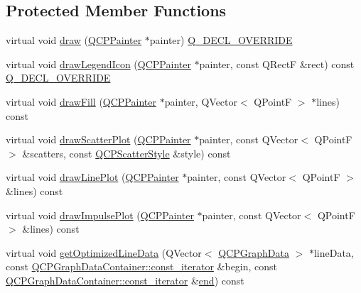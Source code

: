 \subsection*{Protected Member Functions}
\begin{DoxyCompactItemize}
\item 
virtual void \mbox{\hyperlink{class_q_c_p_graph_a2b0849598f06e834b43ce18cd13bcdc3}{draw}} (\mbox{\hyperlink{class_q_c_p_painter}{Q\+C\+P\+Painter}} $\ast$painter) \mbox{\hyperlink{qcustomplot_8h_a42cc5eaeb25b85f8b52d2a4b94c56f55}{Q\+\_\+\+D\+E\+C\+L\+\_\+\+O\+V\+E\+R\+R\+I\+DE}}
\item 
virtual void \mbox{\hyperlink{class_q_c_p_graph_a6efbab06c400bdb15e28b2d0a4ecc18a}{draw\+Legend\+Icon}} (\mbox{\hyperlink{class_q_c_p_painter}{Q\+C\+P\+Painter}} $\ast$painter, const Q\+RectF \&rect) const \mbox{\hyperlink{qcustomplot_8h_a42cc5eaeb25b85f8b52d2a4b94c56f55}{Q\+\_\+\+D\+E\+C\+L\+\_\+\+O\+V\+E\+R\+R\+I\+DE}}
\item 
virtual void \mbox{\hyperlink{class_q_c_p_graph_a67c5ea573f604efd8bf121a0b7a380d1}{draw\+Fill}} (\mbox{\hyperlink{class_q_c_p_painter}{Q\+C\+P\+Painter}} $\ast$painter, Q\+Vector$<$ Q\+PointF $>$ $\ast$lines) const
\item 
virtual void \mbox{\hyperlink{class_q_c_p_graph_abeb0bbe81026c024bf3d508d13cf5e0e}{draw\+Scatter\+Plot}} (\mbox{\hyperlink{class_q_c_p_painter}{Q\+C\+P\+Painter}} $\ast$painter, const Q\+Vector$<$ Q\+PointF $>$ \&scatters, const \mbox{\hyperlink{class_q_c_p_scatter_style}{Q\+C\+P\+Scatter\+Style}} \&style) const
\item 
virtual void \mbox{\hyperlink{class_q_c_p_graph_a4c3edacb2a11064bf2e16b322156aeda}{draw\+Line\+Plot}} (\mbox{\hyperlink{class_q_c_p_painter}{Q\+C\+P\+Painter}} $\ast$painter, const Q\+Vector$<$ Q\+PointF $>$ \&lines) const
\item 
virtual void \mbox{\hyperlink{class_q_c_p_graph_a217ef6bf6c5689eb1dcbe02187d2cc61}{draw\+Impulse\+Plot}} (\mbox{\hyperlink{class_q_c_p_painter}{Q\+C\+P\+Painter}} $\ast$painter, const Q\+Vector$<$ Q\+PointF $>$ \&lines) const
\item 
virtual void \mbox{\hyperlink{class_q_c_p_graph_a1fed1c9d627d9d3b49a6206cc2e60fe1}{get\+Optimized\+Line\+Data}} (Q\+Vector$<$ \mbox{\hyperlink{class_q_c_p_graph_data}{Q\+C\+P\+Graph\+Data}} $>$ $\ast$line\+Data, const \mbox{\hyperlink{class_q_c_p_data_container_ae40a91f5cb0bcac61d727427449b7d15}{Q\+C\+P\+Graph\+Data\+Container\+::const\+\_\+iterator}} \&begin, const \mbox{\hyperlink{class_q_c_p_data_container_ae40a91f5cb0bcac61d727427449b7d15}{Q\+C\+P\+Graph\+Data\+Container\+::const\+\_\+iterator}} \&\mbox{\hyperlink{myutils_8h_a64d77caddefed4b96fa62e3f5f73c9a2}{end}}) const

\end{DoxyCompactItemize}
